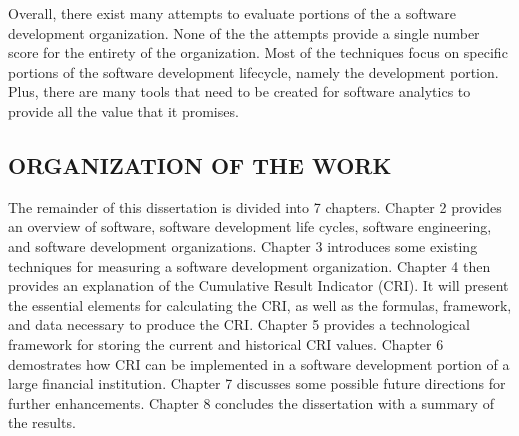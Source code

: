 \documentclass[SDSUThesis.tex]{subfiles}
\begin{document}
    Overall, there exist many attempts to 
    evaluate portions of the a software development 
    organization.  None of the the attempts provide
    a single number score for the entirety of the 
    organization.  Most of the techniques focus on
    specific portions of the software development 
    lifecycle, namely the development portion. Plus,
    there are many tools that need to be created for
    software analytics to provide all the value
    that it promises.

\subsection{ORGANIZATION OF THE WORK}

    The remainder of this dissertation is divided into 7 chapters.  Chapter 2 provides
    an overview of software, software development life cycles, software engineering, and software
    development organizations.  Chapter 3 introduces some existing techniques for measuring
    a software development organization. Chapter 4 then provides an explanation of the Cumulative
    Result Indicator (CRI).  It will present the essential elements for calculating the CRI, as well
    as the formulas, framework, and data necessary to produce the CRI. Chapter 5 provides
    a technological framework for storing the current and historical CRI values.
    Chapter 6 demostrates how CRI can be implemented in a software development portion of 
    a large financial institution. Chapter 7 discusses some possible future directions 
    for further enhancements. Chapter 8 concludes the dissertation with a summary
    of the results. 
\end{document}
